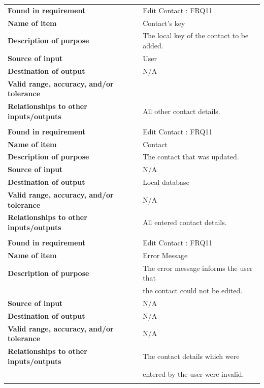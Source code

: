 \newpage
\begin{tabular}{ll}
\textbf{Found in requirement}&Edit Contact : FRQ11\\
\textbf{Name of item}&Contact's key\\
\textbf{Description of purpose}&The local key of the contact to be added.\\
\textbf{Source of input}&User\\
\textbf{Destination of output}&N/A\\
\textbf{Valid range, accuracy, and/or tolerance}&\\
\textbf{Relationships to other inputs/outputs}&All other contact details.\\
&\\
\textbf{Found in requirement}&Edit Contact : FRQ11\\
\textbf{Name of item}&Contact\\
\textbf{Description of purpose}&The contact that was updated.\\
\textbf{Source of input}&N/A\\
\textbf{Destination of output}&Local database\\
\textbf{Valid range, accuracy, and/or tolerance}&N/A\\
\textbf{Relationships to other inputs/outputs}&All entered contact details.\\
&\\
\textbf{Found in requirement}&Edit Contact : FRQ11\\
\textbf{Name of item}&Error Message\\
\textbf{Description of purpose}&The error message informs the user that \\&the contact could not be edited.\\
\textbf{Source of input}&N/A\\
\textbf{Destination of output}&N/A\\
\textbf{Valid range, accuracy, and/or tolerance}&N/A\\
\textbf{Relationships to other inputs/outputs}&The contact details which were \\&entered by the user were invalid.\\
&\\
\end{tabular}

